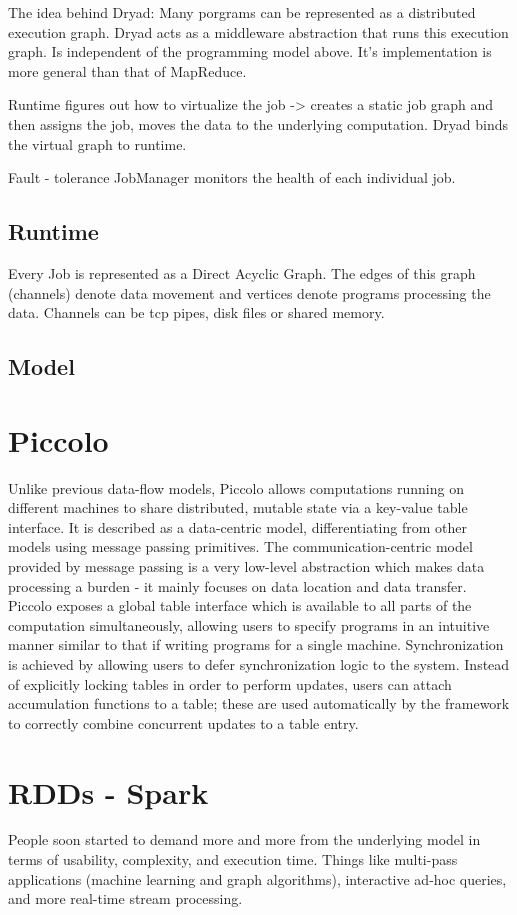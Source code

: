 \documentclass[letterpaper,twocolumn,10pt]{article}
\begin{document}
The idea behind Dryad:
Many porgrams can be represented as a distributed execution graph.
Dryad acts as a middleware abstraction that runs this execution graph.
Is independent of the programming model above. It's implementation is more general than that of MapReduce.

Runtime figures out how to virtualize the job -> creates a static job graph
and then assigns the job, moves the data to the underlying computation.
Dryad binds the virtual graph to runtime.

Fault - tolerance
JobManager monitors the health of each individual job.
\subsection{Runtime}
Every Job is represented as a Direct Acyclic Graph. The edges of this graph (channels) denote data movement and vertices denote programs processing the data. Channels can be tcp pipes, disk files or shared memory.
\subsection{Model}


\section{Piccolo}
Unlike previous data-flow models, Piccolo allows computations running on different machines to share distributed, mutable state via a key-value table  interface. It is described as a data-centric model, differentiating from other models using message passing primitives. The communication-centric model provided by message passing is a very low-level abstraction which makes data processing a burden - it mainly focuses on data location and data transfer. Piccolo exposes a global table interface which is available to all parts of the computation simultaneously, allowing users to specify programs in an intuitive manner similar to that if writing programs for a single machine. Synchronization is achieved by allowing users to defer synchronization logic to the system. Instead of explicitly locking tables in order to perform updates, users can attach accumulation functions to a table; these are used automatically by the framework to correctly combine concurrent updates to a table entry.


\section{RDDs - Spark}
People soon started to demand more and more from the underlying model in terms of usability, complexity, and execution time. Things like multi-pass applications (machine learning and graph algorithms), interactive ad-hoc queries, and more real-time stream processing. 
\end{document}
